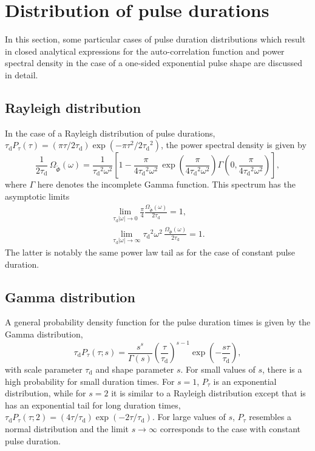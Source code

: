 \documentclass[aps,prb,12pt,a4paper,preprint,amsmath,amssymb,groupedaddress]{revtex4-1}
\newcommand{\abs}[1]{{\left|#1\right|}}\newcommand{\order}[1]{{\mathcal{O}\left(#1\right)}}
\newcommand{\taud}{\ensuremath{\tau_\text{d}}}
\newcommand{\Phiwt}{\ensuremath{\widetilde{\Phi}}}
\begin{document}
\section{Distribution of pulse durations}\label{sec:ptau}



In this section, some particular cases of pulse duration distributions which result in closed analytical expressions for the auto-correlation function and power spectral density in the case of a one-sided exponential pulse shape are discussed in detail.



\subsection{Rayleigh distribution}



In the case of a Rayleigh distribution of pulse durations, $\taud P_\tau(\tau)=(\pi\tau/2\taud)\exp(-\pi\tau^2/2\taud^2)$, the power spectral density is given by
\begin{equation}
\frac{1}{2\taud}\,\Omega_{\Phiwt}(\omega) = \frac{1}{\taud^2\omega^2}
\left[ 1 - \frac{\pi}{4\taud^2\omega^2}\,\exp\left( \frac{\pi}{4\taud^2\omega^2} \right)\Gamma\left( 0,\frac{\pi}{4\taud^2\omega^2} \right) \right] ,
\end{equation}
where $\Gamma$ here denotes the incomplete Gamma function. This spectrum has the asymptotic limits
\begin{subequations}
\begin{gather}
\lim_{\taud\abs{\omega}\rightarrow0} \frac{\pi}{4}\frac{\Omega_{\Phiwt}(\omega)}{2\taud} = 1 ,
\\
\lim_{\taud\abs{\omega}\rightarrow\infty} \taud^2\omega^2\,\frac{\Omega_{\Phiwt}(\omega)}{2\taud} = 1  .
\end{gather}
\end{subequations}
The latter is notably the same power law tail as for the case of constant pulse duration.



\subsection{Gamma distribution}



A general probability density function for the pulse duration times is given by the Gamma distribution,
\begin{equation}
\taud P_\tau(\tau;s) = \frac{s^s}{\Gamma(s)}\left( \frac{\tau}{\taud} \right)^{s-1}\exp\left( - \frac{s\tau}{\taud} \right) ,
\end{equation}
with scale parameter $\taud$ and shape parameter $s$. For small values of $s$, there is a high probability for small duration times. For $s=1$, $P_\tau$ is an exponential distribution, while for $s=2$ it is similar to a Rayleigh distribution except that is has an exponential tail for long duration times, $\taud P_\tau(\tau;2)=(4\tau/\taud)\exp(-2\tau/\taud)$. For large values of $s$, $P_\tau$ resembles a normal distribution and the limit $s\rightarrow\infty$ corresponds to the case with constant pulse duration.
\end{document}
